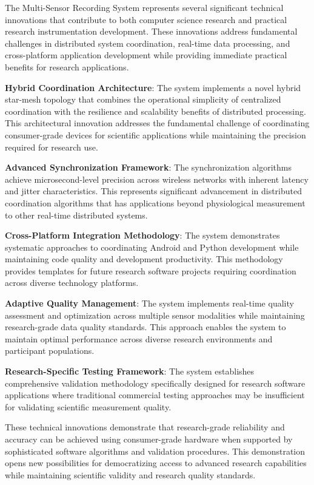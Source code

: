 \documentclass[12pt,a4paper]{report}
\begin{document}
The Multi-Sensor Recording System represents several significant technical innovations that contribute to both computer
science research and practical research instrumentation development. These innovations address fundamental challenges in
distributed system coordination, real-time data processing, and cross-platform application development while providing
immediate practical benefits for research applications.

\textbf{Hybrid Coordination Architecture}: The system implements a novel hybrid star-mesh topology that combines the
operational simplicity of centralized coordination with the resilience and scalability benefits of distributed
processing. This architectural innovation addresses the fundamental challenge of coordinating consumer-grade devices for
scientific applications while maintaining the precision required for research use.

\textbf{Advanced Synchronization Framework}: The synchronization algorithms achieve microsecond-level precision across
wireless networks with inherent latency and jitter characteristics. This represents significant advancement in
distributed coordination algorithms that has applications beyond physiological measurement to other real-time
distributed systems.

\textbf{Cross-Platform Integration Methodology}: The system demonstrates systematic approaches to coordinating Android and
Python development while maintaining code quality and development productivity. This methodology provides templates for
future research software projects requiring coordination across diverse technology platforms.

\textbf{Adaptive Quality Management}: The system implements real-time quality assessment and optimization across multiple
sensor modalities while maintaining research-grade data quality standards. This approach enables the system to maintain
optimal performance across diverse research environments and participant populations.

\textbf{Research-Specific Testing Framework}: The system establishes comprehensive validation methodology specifically
designed for research software applications where traditional commercial testing approaches may be insufficient for
validating scientific measurement quality.

These technical innovations demonstrate that research-grade reliability and accuracy can be achieved using
consumer-grade hardware when supported by sophisticated software algorithms and validation procedures. This
demonstration opens new possibilities for democratizing access to advanced research capabilities while maintaining
scientific validity and research quality standards.
\end{document}

